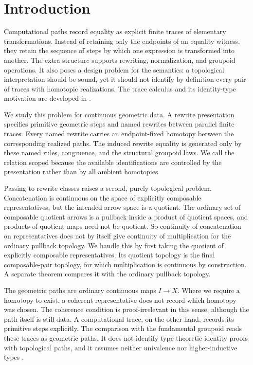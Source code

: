 \documentclass[10pt,reqno]{amsart}
\theoremstyle{definition}
\theoremstyle{plain}
\theoremstyle{remark}
\begin{document}
\section{Introduction}

Computational paths record equality as explicit finite traces of elementary
transformations.  Instead of retaining only the endpoints of an equality
witness, they retain the sequence of steps by which one expression is
transformed into another.  The extra structure supports rewriting,
normalization, and groupoid operations.  It also poses a design problem for
the semantics: a topological interpretation should be sound, yet it should not
identify by definition every pair of traces with homotopic realizations.  The trace calculus
and its identity-type motivation are developed in
\cite{RamosDeQueirozDeOliveira2016propositional,Ramos2017identity,
RamosDeQueirozDeOliveiraDeVeras2018explicit}.

We study this problem for continuous geometric data.  A rewrite presentation
specifies primitive geometric steps and named rewrites between parallel finite
traces.  Every named rewrite carries an endpoint-fixed homotopy between the
corresponding realized paths.  The induced rewrite equality is generated only
by these named rules, congruence, and the structural groupoid laws.  We call
the relation scoped because the available identifications are controlled by
the presentation rather than by all ambient homotopies.

Passing to rewrite classes raises a second, purely topological problem.
Concatenation is continuous on the space of explicitly composable
representatives, but the intended arrow space is a quotient.  The ordinary
set of composable quotient arrows is a pullback inside a product of quotient
spaces, and products of quotient maps need not be quotient.  So continuity
of concatenation on representatives does not by itself give continuity of
multiplication for the ordinary pullback topology.  We handle this by first
taking the quotient of explicitly composable representatives.  Its quotient
topology is the final composable-pair topology, for which multiplication is
continuous by construction.  A separate theorem compares it with the ordinary
pullback topology.

The geometric paths are ordinary continuous maps $I\to X$.
Where we require a homotopy to exist, a coherent representative does not
record which homotopy was chosen.  The coherence condition is proof-irrelevant
in this sense, although the path itself is still data.  A computational trace,
on the other hand, records its primitive steps explicitly.  The comparison
with the fundamental groupoid reads these traces as geometric paths.  It does
not identify type-theoretic identity proofs with topological paths, and it
assumes neither univalence nor higher-inductive types
\cite{HofmannStreicher98,Brown06,Hatcher02}.
\end{document}
